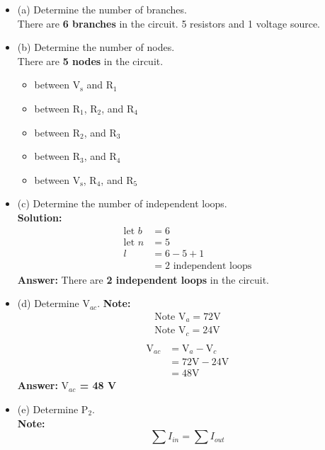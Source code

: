 \documentclass{article}
\begin{document}
\begin{itemize}
	\item (a) Determine the number of branches. \\
		There are \textbf{6 branches} in the circuit. 5 resistors and 1 voltage source.
	\item (b) Determine the number of nodes. \\
		There are \textbf{5 nodes} in the circuit.
		\begin{itemize}
			\item between $\text{V}_\text{s}$ and $\text{R}_\text{1}$
			\item between $\text{R}_\text{1}$, $\text{R}_\text{2}$, and $\text{R}_\text{4}$
			\item between $\text{R}_\text{2}$, and $\text{R}_\text{3}$
			\item between $\text{R}_\text{3}$, and $\text{R}_\text{4}$
			\item between $\text{V}_\text{s}$, $\text{R}_\text{4}$, and $\text{R}_\text{5}$
		\end{itemize}
	\item (c) Determine the number of independent loops.\\
		\textbf{Solution:}
		\begin{align*}
			\text{let } b &= 6 \\
			\text{let } n &= 5 \\
			l &= 6 - 5 + 1 \\
			&= 2 \text{ independent loops}
		\end{align*}
		\textbf{Answer:} There are \textbf{2 independent loops} in the circuit.
		\item (d) Determine $\text{V}_{ac}$.
		\textbf{Note:}
		\begin{align*}
			\text{Note } \text{V}_a = 72 \text{V} \\
			\text{Note } \text{V}_c = 24 \text{V} \\
		\end{align*}
		\begin{align*}
			\text{V}_{ac} &= \text{V}_a - \text{V}_c \\
			&= 72 \text{V} - 24 \text{V} \\
			&= 48 \text{V}
		\end{align*}
		\textbf{Answer:} \textbf{$\text{V}_{ac}$ = 48 V}
	\item (e) Determine $\text{P}_2$. \\
		\textbf{Note:}
		\begin{equation}
			\sum{I_{in}} = \sum{I_{out}}

\end{equation}
\end{itemize}
\end{document}
